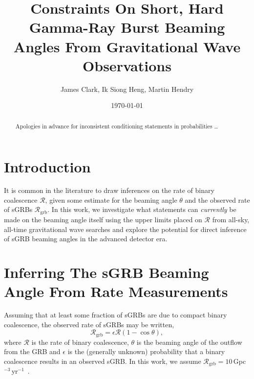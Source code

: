 \documentclass[twocolumn,nofootinbib]{revtex4}
\newcommand{\gw}{gravitational wave }
\newcommand{\grbRate}{{{\mathcal R}_{\mathrm{grb}}}}
\newcommand{\cbcrate}{{{\mathcal R}}}
\begin{document}
\title{Constraints On Short, Hard Gamma-Ray Burst Beaming Angles From
Gravitational Wave Observations}
\author{James Clark, Ik Siong Heng, Martin Hendry}
\date{\today}

\begin{abstract}
Apologies in advance for inconsistent conditioning statements in probabilities
\dots
\end{abstract}

\maketitle

\section{Introduction}

It is common in the literature to draw inferences on the rate of binary
coalescence $\cbcrate$, given some estimate for the beaming angle $\theta$ and
the observed rate of sGRBs $\grbRate$.  In this work, we investigate what
statements can \emph{currently} be made on the beaming angle itself using the
upper limits placed on $\cbcrate$ from all-sky, all-time \gw searches and
explore the potential for direct inference of sGRB  beaming angles in the
advanced detector era.

\section{Inferring The sGRB Beaming Angle From Rate Measurements}
Assuming that at least some fraction of sGRBs are due to compact binary
coalescence, the observed rate of sGRBs may be written,
%
\begin{equation}\label{eq:rate2angle}
\grbRate=\epsilon\cbcrate(1-\cos \theta),
\end{equation}
%
where $\cbcrate$ is the rate of binary coalescence, $\theta$ is the beaming
angle of the outflow from the GRB and $\epsilon$ is the (generally unknown)
probability that a binary coalescence results in an observed sGRB.  In this
work, we assume
$\grbRate=10$\,Gpc$^{-3}$\,yr$^{-1}$~\cite{nakar-2007,Dietz11}.
 
\end{document}
